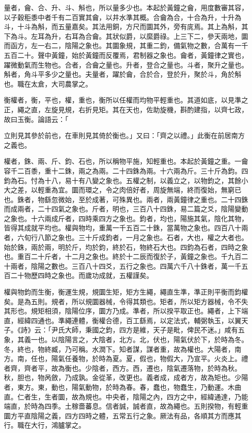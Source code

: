 \begin{pinyinscope}
量者，龠、合、升、斗、斛也，所以量多少也。本起於黃鐘之龠，用度數審其容，以子穀秬黍中者千有二百實其龠，以井水準其概。合龠為合，十合為升，十升為斗，十斗為斛，而五量嘉矣。其法用銅，方尺而圜其外，旁有庣焉。其上為斛，其下為斗。左耳為升，右耳為合龠。其狀似爵，以縻爵祿。上三下二，參天兩地，圜而函方，左一右二，陰陽之象也。其圜象規，其重二鈞，備氣物之數，合萬有一千五百二十。聲中黃鐘，始於黃鐘而反覆焉，君制器之象也。龠者，黃鐘律之實也，躍微動氣而生物也。合者，合龠之量也。升者，登合之量也。斗者，聚升之量也。斛者，角斗平多少之量也。夫量者，躍於龠，合於合，登於升，聚於斗，角於斛也。職在太倉，大司農掌之。

衡權者，衡，平也，權，重也，衡所以任權而均物平輕重也。其道如底，以見準之正，繩之直，左旋見規，右折見矩。其在天也，佐助旋機，斟酌建指，以齊七政，故曰玉衡。論語云：「

立則見其參於前也，在車則見其倚於衡也。」又曰：「齊之以禮。」此衡在前居南方之義也。

權者，銖、兩、斤、鈞、石也，所以稱物平施，知輕重也。本起於黃鐘之重。一龠容千二百黍，重十二銖，兩之為兩。二十四銖為兩。十六兩為斤。三十斤為鈞。四鈞為石。忖為十八，易十有八變之象也。五權之制，以義立之，以物鈞之，其餘小大之差，以輕重為宜。圜而環之，令之肉倍好者，周旋無端，終而復始，無窮已也。銖者，物繇忽微始，至於成著，可殊異也。兩者，兩黃鐘律之重也。二十四銖而成兩者，二十四氣之象也。斤者，明也，三百八十四銖，易二篇之爻，陰陽變動之象也。十六兩成斤者，四時乘四方之象也。鈞者，均也，陽施其氣，陰化其物，皆得其成就平均也。權與物均，重萬一千五百二十銖，當萬物之象也。四百八十兩者，六旬行八節之象也。三十斤成鈞者，一月之象也。石者，大也，權之大者也。始於銖，兩於兩，明於斤，均於鈞，終於石，物終石大也。四鈞為石者，四時之象也。重百二十斤者，十二月之象也。終於十二辰而復於子，黃鐘之象也。千九百二十兩者，陰陽之數也。三百八十四爻，五行之象也。四萬六千八十銖者，萬一千五百二十物歷四時之象也。而歲功成就，五權謹矣。

權與物鈞而生衡，衡運生規，規圜生矩，矩方生繩，繩直生準，準正則平衡而鈞權矣。是為五則。規者，所以規圜器械，令得其類也。矩者，所以矩方器械，令不失其形也。規矩相須，陰陽位序，圜方乃成。準者，所以揆平取正也。繩者，上下端直，經緯四通也。準繩連體，衡權合德，百工繇焉，以定法式，輔弼執玉，以翼天子。《詩》云：「尹氏大師，秉國之鈞，四方是維，天子是毗，俾民不迷。」咸有五象，其義一也。以陰陽言之，大陰者，北方。北，伏也，陽氣伏於下，於時為冬。冬，終也，物終臧，乃可稱。水潤下。知者謀，謀者重，故為權也。大陽者，南方。南，任也，陽氣任養物，於時為夏。夏，假也，物假大，乃宣平。火炎上。禮者齊，齊者平，故為衡也。少陰者，西方。西，遷也，陰氣遷落物，於時為秋。秋，胆也，物呙斂，乃成孰。金從革，改更也。義者成，成者方，故為矩也。少陽者，東方。東，動也，陽氣動物，於時為春。春，蠢也，物蠢生，乃動運。木曲直。仁者生，生者圜，故為規也。中央者，陰陽之內，四方之中，經緯通達，乃能端直，於時為四季。土稼嗇蕃息。信者誠，誠者直，故為繩也。五則揆物，有輕重圜方平直陰陽之義，四方四時之體，五常五行之象。厥法有品，各順其方而應其行。職在大行，鴻臚掌之。


\end{pinyinscope}
